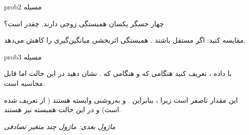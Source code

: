 \begin{PSbox}[unbreakable]{prob}{مسیله 2}

چهار حسگر یکسان  همبستگی زوجی  دارند.  چقدر است؟

\PSsolution{} 

مقایسه کنید: اگر مستقل باشند . همبستگی اثربخشی میانگین‌گیری را کاهش می‌دهد.

\end{PSbox}

\begin{PSbox}[unbreakable]{prob}{مسیله 3}

با داده ، تعریف کنید  هنگامی که  و  هنگامی که . نشان دهید در این حالت  اما  قابل محاسبه است.

\PSsolution{} \PSbr{}\PSbr{}این مقدار ناصفر است زیرا ، بنابراین .\PSbr{} و  به‌روشنی وابسته هستند ( از  تعریف شده است) و در این حالت همبسته نیز هستند.

\emph{ماژول بعدی: {ماژول  چند متغیر تصادفی}}\PSbr{}

\end{PSbox}
